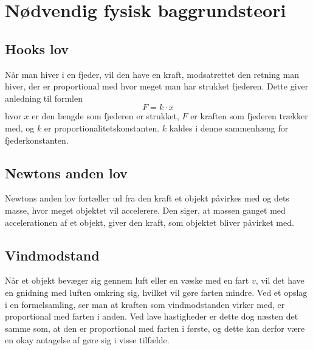 \section{Nødvendig fysisk baggrundsteori}
\subsection{Hooks lov}\label{teori:Hooks lov}
Når man hiver i en fjeder, vil den have en kraft, modsatrettet den retning man hiver, der er proportional med hvor meget man har strukket fjederen. 
Dette giver anledning til formlen 
$$F =k\cdot x$$
hvor $x$ er den længde som fjederen er strukket, $F$ er kraften som fjederen trækker med, og $k$ er proportionalitetskonstanten. 
$k$ kaldes i denne sammenhæng for fjederkonstanten.

\subsection{Newtons anden lov}\label{teori:Newtons anden lov}
Newtons anden lov fortæller ud fra den kraft et objekt påvirkes med og dets masse, hvor meget objektet vil accelerere. 
Den siger, at massen ganget med accelerationen af et objekt, giver den kraft, som objektet bliver påvirket med.

\subsection{Vindmodstand}\label{teori:vindmodstand}
Når et objekt bevæger sig gennem luft eller en væske med en fart $v$, vil det have en gnidning med luften omkring sig, hvilket vil gøre farten mindre.
Ved et opslag i en formelsamling, ser man at kraften som vindmodstanden virker med, er proportional med farten i anden. 
Ved lave hastigheder er dette dog næsten det samme som, at den er proportional med farten i første, og dette kan derfor være en okay antagelse af gøre sig i visse tilfælde.
